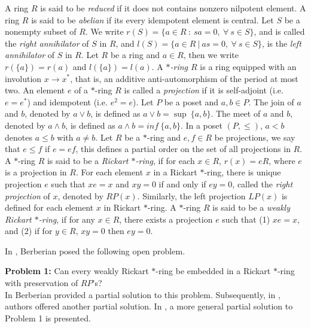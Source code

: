 \documentclass[11pt, one side,emlines]{amsart}
\theoremstyle{definition}
\numberwithin{equation}{section} \thispagestyle{empty} \voffset
\begin{document}
       A ring $R$ is said to be {\it reduced} if it does not contains
    nonzero nilpotent element.  A ring $R$ is said to be {\it abelian} if its every idempotent element is central.  
   Let $S$ be a nonempty subset of $R$. We write
          $r(S)= \{a \in R ~:~ s a = 0, ~\forall ~s \in S \}$, and is called the
          {\it right annihilator} of $S$ in $R$, and $l(S)= \{a \in R ~|~  a s = 0, ~\forall ~s \in S \}$, 
          is the
         { \it left annihilator} of $S$ in $R$. Let $R$ be a ring and $a\in R$, then we write $r(\{a\})=r(a)$ and $l(\{a\})=l(a)$.      
    A {\it $*$-ring $R$} is a ring equipped with an involution $x \rightarrow x^* $,
                        that is, an additive anti-automorphism of the period at most two.
    An element $e$ of a $*$-ring  $R$ is called a {\it projection} if it is self-adjoint 
         (i.e. $e=e^*$)
       and idempotent (i.e. $e^2=e$).  Let $P$ be a poset and $a,b \in P$. The join of $a$ and $b$, denoted by
       $a\vee b$, is defined as $a \vee b = \sup~ \{a, b\}$. The meet of $a$ and $b$, denoted by $a\wedge b$, is defined as $a \wedge b= inf~ \{a, b\}$.  
       In a poset $(P, \leq)$, $a < b$ denotes $a\leq b$ with $a \neq b$. Let $R$ be a $*$-ring and $e,f \in R $ be projections, we say that $e \leq f$ if $e=ef$, this defines a partial order on the set of all projections in $R$.
      A $*$-ring $R$ is said to be a {\it  Rickart $*$-ring},
  if for each $x \in R$, $r(x)=eR$, where $e$ is a projection
  in $R$. 
   For each element $x$ in a Rickart $*$-ring, there is unique projection
  $e$ such that $xe=x$ and $xy=0$ if and only if $ey=0$, called the {\it
  	right projection} of $x$, denoted by $RP(x)$. Similarly, the left
  projection $LP(x)$ is defined for each element $x$ in Rickart $*$-ring.
  A $*$-ring $R$ is said to be a {\it weakly Rickart  $*$-ring}, if for any $x \in R$, there exists a projection $e$
  such that (1) $xe=x$, and (2) if for $y\in R$, $xy=0$ then $ey=0$.
  
     In \cite{Ber}, Berberian posed the following open problem.
            
 {\bf Problem 1:} Can every weakly Rickart $*$-ring be
 embedded in a Rickart $*$-ring with preservation of $RP$'s?\\
 In \cite{Ber} Berberian provided a partial solution to this problem. Subsequently, in \cite{Tha3}, authors offered another partial solution. In \cite{more1}, a more general partial solution to Problem 1 is presented. 
 
\end{document}
